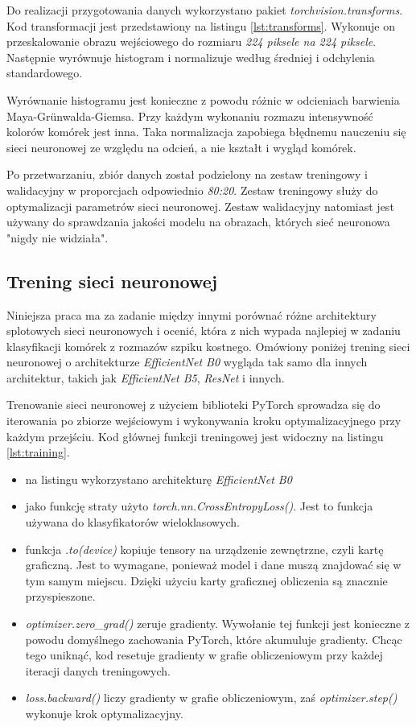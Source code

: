 Do realizacji przygotowania danych wykorzystano pakiet \textit{torchvision.transforms}.
Kod transformacji jest przedstawiony na listingu \ref{lst:transforms}.
Wykonuje on przeskalowanie obrazu wejściowego do rozmiaru \textit{224 piksele na 224 piksele}.
Następnie wyrównuje histogram i normalizuje według średniej i odchylenia standardowego.

Wyrównanie histogramu jest konieczne z powodu różnic w odcieniach barwienia Maya-Grünwalda-Giemsa.
Przy każdym wykonaniu rozmazu intensywność kolorów komórek jest inna.
Taka normalizacja zapobiega błędnemu nauczeniu się sieci neuronowej ze względu na odcień, a nie kształt i wygląd komórek.

Po przetwarzaniu, zbiór danych został podzielony na zestaw treningowy i walidacyjny w proporcjach odpowiednio \textit{80:20}.
Zestaw treningowy służy do optymalizacji parametrów sieci neuronowej.
Zestaw walidacyjny natomiast jest używany do sprawdzania jakości modelu na obrazach, których sieć neuronowa "nigdy nie widziała".

\subsection{Trening sieci neuronowej}

Niniejsza praca ma za zadanie między innymi porównać różne architektury splotowych sieci neuronowych i ocenić,
która z nich wypada najlepiej w zadaniu klasyfikacji komórek z rozmazów szpiku kostnego.
Omówiony poniżej trening sieci neuronowej o architekturze \textit{EfficientNet B0} wygląda tak samo dla innych architektur, takich jak \textit{EfficientNet B5}, \textit{ResNet} i innych.

Trenowanie sieci neuronowej z użyciem biblioteki PyTorch sprowadza się do iterowania po zbiorze wejściowym i wykonywania kroku optymalizacyjnego przy każdym przejściu.
Kod głównej funkcji treningowej jest widoczny na listingu \ref{lst:training}.

\begin{itemize}
    \item na listingu wykorzystano architekturę \textit{EfficientNet B0}
    \item jako funkcję straty użyto \textit{torch.nn.CrossEntropyLoss()}.
    Jest to funkcja używana do klasyfikatorów wieloklasowych.
    \item funkcja \textit{.to(device)} kopiuje tensory na urządzenie zewnętrzne, czyli kartę graficzną.
    Jest to wymagane, ponieważ model i dane muszą znajdować się w tym samym miejscu.
    Dzięki użyciu karty graficznej obliczenia są znacznie przyspieszone.
    \item \textit{optimizer.zero\_grad()} zeruje gradienty.
    Wywołanie tej funkcji jest konieczne z powodu domyślnego zachowania PyTorch, które akumuluje gradienty.
    Chcąc tego uniknąć, kod resetuje gradienty w grafie obliczeniowym przy każdej iteracji danych treningowych.
    \item \textit{loss.backward()} liczy gradienty w grafie obliczeniowym, zaś \textit{optimizer.step()} wykonuje krok optymalizacyjny.
\end{itemize}


